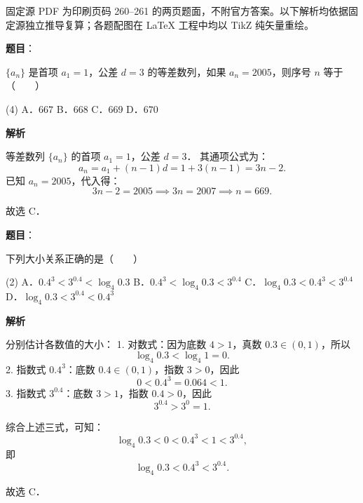 

\begin{gktip}
固定源 PDF 为印刷页码 260–261 的两页题面，不附官方答案。以下解析均依据固定源独立推导复算；各题配图在 LaTeX 工程中均以 TikZ 纯矢量重绘。
\end{gktip}

\begin{answer}

\textbf{题目}：

$\{a_n\}$ 是首项 $a_1 = 1$，公差 $d = 3$ 的等差数列，如果 $a_n = 2005$，则序号 $n$ 等于\mbox{（　　）}

\begin{gkopts}(4)
\task A．$667$
\task B．$668$
\task C．$669$
\task D．$670$
\end{gkopts}

\textbf{解析}

等差数列 $\{a_n\}$ 的首项 $a_1 = 1$，公差 $d = 3$．
其通项公式为：
\nopagebreak[4]
\[
a_n = a_1 + (n - 1)d = 1 + 3(n - 1) = 3n - 2.
\]
已知 $a_n = 2005$，代入得：
\nopagebreak[4]
\[
3n - 2 = 2005 \implies 3n = 2007 \implies n = 669.
\]

故选 C．


\end{answer}
\begin{answer}

\textbf{题目}：

下列大小关系正确的是\mbox{（　　）}

\begin{gkopts}(2)
\task A．$0.4^3 < 3^{0.4} < \log_4 0.3$
\task B．$0.4^3 < \log_4 0.3 < 3^{0.4}$
\task C．$\log_4 0.3 < 0.4^3 < 3^{0.4}$
\task D．$\log_4 0.3 < 3^{0.4} < 0.4^3$
\end{gkopts}

\textbf{解析}

分别估计各数值的大小：
1. 对数式：因为底数 $4 > 1$，真数 $0.3 \in (0, 1)$，所以
\nopagebreak[4]
\[
\log_4 0.3 < \log_4 1 = 0.
\]
2. 指数式 $0.4^3$：底数 $0.4 \in (0, 1)$，指数 $3 > 0$，因此
\nopagebreak[4]
\[
0 < 0.4^3 = 0.064 < 1.
\]
3. 指数式 $3^{0.4}$：底数 $3 > 1$，指数 $0.4 > 0$，因此
\nopagebreak[4]
\[
3^{0.4} > 3^0 = 1.
\]

综合上述三式，可知：
\nopagebreak[4]
\[
\log_4 0.3 < 0 < 0.4^3 < 1 < 3^{0.4},
\]
即
\nopagebreak[4]
\[
\log_4 0.3 < 0.4^3 < 3^{0.4}.
\]

故选 C．


\end{answer}
